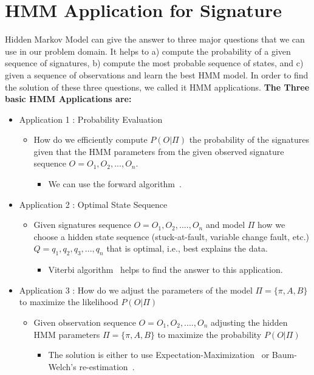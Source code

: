 \section{HMM Application for Signature}
Hidden Markov Model can give the answer to three major questions that we can use in our problem domain. It helps to a) compute the probability of a given sequence of signatures, b) compute the most probable sequence of states, and c) given a sequence of observations and learn the best HMM model.
In order to find the solution of these three questions, we called it HMM applications.
\textbf{The Three basic HMM Applications are:}
\begin{itemize}
\item Application 1 : Probability Evaluation
 \begin{itemize}
 \item How do we efficiently compute $P(O|\Pi)$ the probability of the signatures given that the HMM parameters from the given observed signature sequence $O = {O_1, O_2,...,O_n}$.
 
  \begin{itemize}
  \item We can use the forward algorithm~\cite{ghahramani1996factorial}.
  \end{itemize}
 \end{itemize}
\end{itemize}
\begin{itemize}
\item Application 2 : Optimal State Sequence
 \begin{itemize}
 \item Given signatures sequence $O = {O_1, O_2, ...., }O_n$ and model $\Pi$ how we choose a hidden state sequence (stuck-at-fault, variable change fault, etc.) $Q={q_1,q_2,q_3, ..., q_n}$
that is optimal, i.e., best explains the data. 
  \begin{itemize}
  \item Viterbi algorithm~\cite{forney1973viterbi} helps to find the answer to this application.
  \end{itemize}
 \end{itemize}
\end{itemize}
\begin{itemize}
\item Application 3 : How do we adjust the parameters of the model $\Pi = \{\pi, A, B\}$ to maximize the likelihood $P(O|\Pi)$ 
 \begin{itemize}
 \item Given observation sequence $O = {O_1, O_2,....,} O_n$ adjusting the hidden HMM parameters $ \Pi = \{\pi,A, B\}$ to maximize the probability $P(O|\Pi)$ 
  \begin{itemize}
  \item The solution is either to use Expectation-Maximization~\cite{moon1996expectation} or Baum-Welch’s re-estimation~\cite{leggetter1995maximum}.
  \end{itemize}
 \end{itemize}
\end{itemize}


